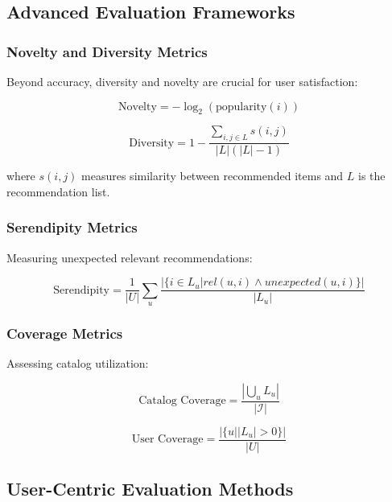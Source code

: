 \subsection{Advanced Evaluation Frameworks}

\subsubsection{Novelty and Diversity Metrics}

Beyond accuracy, diversity and novelty are crucial for user satisfaction:

\begin{equation}
\text{Novelty} = -\log_2(\text{popularity}(i))
\label{eq:novelty}
\end{equation}

\begin{equation}
\text{Diversity} = 1 - \frac{\sum_{i,j \in L} s(i,j)}{|L|(|L|-1)}
\label{eq:diversity}
\end{equation}

where $s(i,j)$ measures similarity between recommended items and $L$ is the recommendation list.

\subsubsection{Serendipity Metrics}

Measuring unexpected relevant recommendations:

\begin{equation}
\text{Serendipity} = \frac{1}{|U|} \sum_u \frac{|\{i \in L_u | rel(u,i) \land unexpected(u,i)\}|}{|L_u|}
\label{eq:serendipity}
\end{equation}

\subsubsection{Coverage Metrics}

Assessing catalog utilization:

\begin{equation}
\text{Catalog Coverage} = \frac{|\bigcup_u L_u|}{|\mathcal{I}|}
\label{eq:coverage}
\end{equation}

\begin{equation}
\text{User Coverage} = \frac{|\{u | |L_u| > 0\}|}{|U|}
\label{eq:user_coverage}
\end{equation}

\subsection{User-Centric Evaluation Methods}

